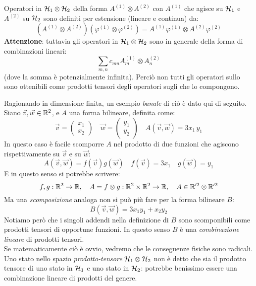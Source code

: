 \documentclass[../../FisicaTeorica.tex]{subfiles}
\begin{document}
Operatori in $\mathcal{H}_1 \otimes \mathcal{H}_2$ della forma $A^{(1)}\otimes A^{(2)}$ con $A^{(1)}$ che agisce su $\mathcal{H}_1$ e $A^{(2)}$ su $\mathcal{H}_2$ sono definiti per estensione (lineare e continua) da:
\begin{equation}
(A^{(1)}\otimes A^{(2)})(\varphi^{(1)}\otimes \varphi^{(2)}
)=A^{(1)}\varphi^{(1)} \otimes A^{(2)}\varphi^{(2)}
\label{eqn:prod_tensore_operatori}
\end{equation}
\textbf{Attenzione}: tuttavia gli operatori in $\mathcal{H}_1 \otimes \mathcal{H}_2$ sono in generale della forma di combinazioni lineari:
\[
\sum_{m,n} c_{mn} A_m^{(1)}\otimes A^{(2)}_n
\]
(dove la somma è potenzialmente infinita). Perciò non tutti gli operatori sullo  sono ottenibili come prodotti tensori degli operatori sugli  che lo compongono.
\begin{expl}
Ragionando in dimensione finita, un esempio \textit{banale} di ciò è dato qui di seguito.\\
Siano $\vec{v},\vec{w}\in \mathbb{R}^2$, e $A$ una forma bilineare, definita come:
\[
\vec{v}=\begin{pmatrix}x_1\\ x_2\end{pmatrix} \quad \vec{w}=\begin{pmatrix} y_1 \\ y_2 \end{pmatrix}\quad A(\vec{v},\vec{w})=3x_1\,y_1
\]
In questo caso è facile scomporre $A$ nel prodotto di due funzioni che agiscono rispettivamente su $\vec{v}$ e su $\vec{w}$:
\[
A(\vec{v},\vec{w})=f(\vec{v}) g(\vec{w}) \quad f(\vec{v}) =3x_1 \quad g(\vec{w})=y_1
\]
E in questo senso si potrebbe scrivere:
\[
f,g:\mathbb{R}^2\to\mathbb{R},\quad 
A = f \otimes g: \mathbb{R}^2\times\mathbb{R}^2\to\mathbb{R},\quad A\in \mathbb{R}'^2 \otimes \mathbb{R}'^{2}
\]
Ma una \textit{scomposizione} analoga non si può più fare per la forma bilineare $B$:
\[
B(\vec{v},\vec{w})=3x_1 y_1 +x_2 y_2
\]
Notiamo però che i singoli addendi nella definizione di $B$ sono scomponibili come prodotti tensori di opportune funzioni. In questo senso $B$ è una \textit{combinazione lineare} di prodotti tensori.\\
Se matematicamente ciò è ovvio, vedremo che le conseguenze fisiche sono radicali. Uno stato nello spazio \textit{prodotto-tensore} $\mathcal{H}_1\otimes \mathcal{H}_2$ non è detto che sia il prodotto tensore di uno stato in $\mathcal{H}_1$ e uno stato in $\mathcal{H}_2$: potrebbe benissimo essere una combinazione lineare di prodotti del genere. %
\end{expl}
\end{document}
